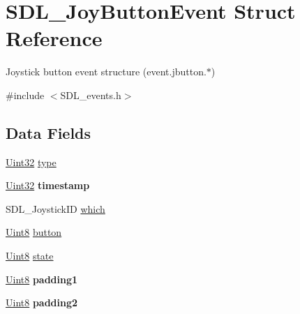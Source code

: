 \hypertarget{struct_s_d_l___joy_button_event}{}\section{S\+D\+L\+\_\+\+Joy\+Button\+Event Struct Reference}
\label{struct_s_d_l___joy_button_event}


Joystick button event structure (event.\+jbutton.$\ast$)  




{\ttfamily \#include $<$S\+D\+L\+\_\+events.\+h$>$}

\subsection*{Data Fields}
\begin{DoxyCompactItemize}
\item 
\hyperlink{_s_d_l__stdinc_8h_add440eff171ea5f55cb00c4a9ab8672d}{Uint32} \hyperlink{struct_s_d_l___joy_button_event_aa40a9b05c3154032b9f2d7220e9f08dc}{type}
\item 
\hyperlink{_s_d_l__stdinc_8h_add440eff171ea5f55cb00c4a9ab8672d}{Uint32} {\bfseries timestamp}\hypertarget{struct_s_d_l___joy_button_event_abf1ed7edeab81db9c05d899836a44a2f}{}\label{struct_s_d_l___joy_button_event_abf1ed7edeab81db9c05d899836a44a2f}

\item 
S\+D\+L\+\_\+\+Joystick\+ID \hyperlink{struct_s_d_l___joy_button_event_a911f8b28e26cf5ad3e985e76d4987014}{which}
\item 
\hyperlink{_s_d_l__stdinc_8h_a2944638813a090aa23e62f4da842c3e2}{Uint8} \hyperlink{struct_s_d_l___joy_button_event_a63c1d3c03e676c0ea5864dc6d0b0082c}{button}
\item 
\hyperlink{_s_d_l__stdinc_8h_a2944638813a090aa23e62f4da842c3e2}{Uint8} \hyperlink{struct_s_d_l___joy_button_event_a6b8d8e916bc56265a3fd279bd26b6d1b}{state}
\item 
\hyperlink{_s_d_l__stdinc_8h_a2944638813a090aa23e62f4da842c3e2}{Uint8} {\bfseries padding1}\hypertarget{struct_s_d_l___joy_button_event_a418ddf227b900bac743797ea1d27040f}{}\label{struct_s_d_l___joy_button_event_a418ddf227b900bac743797ea1d27040f}

\item 
\hyperlink{_s_d_l__stdinc_8h_a2944638813a090aa23e62f4da842c3e2}{Uint8} {\bfseries padding2}\hypertarget{struct_s_d_l___joy_button_event_a09e3169fff93f108fc1dab93014eb1fb}{}\label{struct_s_d_l___joy_button_event_a09e3169fff93f108fc1dab93014eb1fb}

\end{DoxyCompactItemize}


